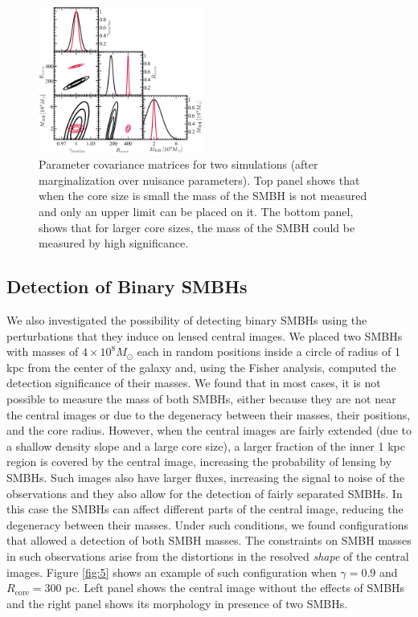 \documentclass[chicago]{emulateapj}
\begin{document}
\begin{figure}
\begin{center}
\centering
\includegraphics[trim= 2 5 0 0, clip, width=0.48\textwidth]{figures/f_04.eps}
\centering
\end{center}
\caption{ Parameter covariance matrices for two simulations (after marginalization over nuisance parameters). Top panel shows that when the core size is small the mass of the SMBH is not measured and only an upper limit can be placed on it. The bottom panel, shows that for larger core sizes, the mass of the SMBH could be measured by high significance. 
\label{fig:4}}
\end{figure}


\subsection{Detection of Binary SMBHs}
We also investigated the possibility of detecting binary SMBHs using the perturbations that they induce on lensed central images. 
We placed two SMBHs with masses of $4\times10^8 M_{\odot}$ each in random positions inside a circle of radius of 1 kpc from the center of the galaxy and, using the Fisher analysis, computed the detection significance of their masses. 
We found that in most cases, it is not possible to measure the mass of both SMBHs, either because they are not near the central images or due to the degeneracy between their masses, their positions, and the core radius. %
However, when the central images are fairly extended (due to a shallow density slope and a large core size), a larger fraction of the inner 1 kpc region is covered by the central image, increasing the probability of lensing by SMBHs. Such images also have larger fluxes, increasing the signal to noise of the observations and they also allow for the detection of fairly separated SMBHs. In this case the SMBHs can affect different parts of the central image, reducing the degeneracy between their masses.
Under such conditions, we found configurations that allowed a detection of both SMBH masses. The constraints on SMBH masses in such observations arise from the distortions in the resolved \emph{shape} of the central images. Figure \ref{fig:5} shows an example of such configuration when $\gamma = 0.9$ and $R_{\mathrm{core}}=300$ pc. Left panel shows the central image without the effects of SMBHs and the right panel shows its morphology in presence of two SMBHs. 
\end{document}
